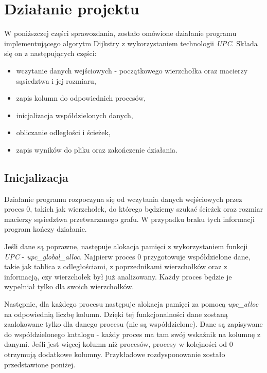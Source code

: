 \documentclass[12pt]{article}
\begin{document}
\clearpage
\section{Działanie projektu}
W poniższczej części sprawozdania, zostało omówione działanie programu implementującego algorytm Dijkstry z wykorzystaniem technologii \textit{UPC}. Składa się on z następujących części:
\begin{itemize}
\item wczytanie danych wejściowych - początkowego wierzchołka oraz macierzy sąsiedztwa i jej rozmiaru,
\item zapis kolumn do odpowiednich procesów,
\item inicjalizacja współdzielonych danych,
\item obliczanie odległości i ścieżek,
\item zapis wyników do pliku oraz zakończenie działania.

\end{itemize}

\subsection{Inicjalizacja}
Działanie programu rozpoczyna się od wczytania danych wejściowych przez proces 0, takich jak wierzchołek, do którego będziemy szukać ścieżek oraz rozmiar macierzy sąsiedztwa przetwarzanego grafu. W przypadku braku tych informacji program kończy działanie.

Jeśli dane są poprawne, następuje alokacja pamięci z wykorzystaniem funkcji \textit{UPC} - \textit{upc\_global\_alloc}. Najpierw proces 0 przygotowuje współdzielone dane, takie jak tablica z odległościami, z poprzednikami wierzchołków oraz z informacją, czy wierzchołek był już analizowany. Każdy proces będzie je wypełniał tylko dla swoich wierzchołków.

Następnie, dla każdego procesu następuje alokacja pamięci za pomocą  \textit{upc\_alloc} na odpowiednią liczbę kolumn. Dzięki tej funkcjonalności dane zostaną zaalokowane tylko dla danego procesu (nie są współdzielone). Dane są zapisywane do współdzielonego katalogu - każdy proces ma tam swój wskaźnik na kolumnę z danymi. Jeśli jest więcej kolumn niż procesów, procesy w kolejności od 0 otrzymują dodatkowe kolumny. Przykładowe rozdysponowanie zostało przedstawione poniżej. 
\end{document}
